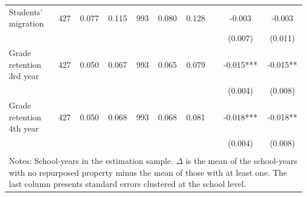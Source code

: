 \documentclass[12pt]{article}
\theoremstyle{plain}
\theoremstyle{plain}
\theoremstyle{plain}
\theoremstyle{definition}
\theoremstyle{plain}
\theoremstyle{definition}
\theoremstyle{plain}
\theoremstyle{remark}
\theoremstyle{definition}
\theoremstyle{definition}
\theoremstyle{plain}
\begin{document}
\begin{table}[H]
{\begin{tabular}{p{10.11em}lllllllll}
    \multicolumn{1}{l}{Students' migration} & \multicolumn{1}{c}{427} & \multicolumn{1}{c}{0.077} & \multicolumn{1}{c}{0.115} & \multicolumn{1}{c}{993} & \multicolumn{1}{c}{0.080} & \multicolumn{1}{c}{0.128} & \multicolumn{1}{c|}{} & \multicolumn{1}{c}{-0.003} & \multicolumn{1}{c}{-0.003} \\
    \multicolumn{1}{r}{} &       &       &       &       &       &       & \multicolumn{1}{c|}{} & \multicolumn{1}{c}{(0.007)} & \multicolumn{1}{c}{(0.011)} \\
    \multicolumn{1}{l}{Grade retention 3rd year} & \multicolumn{1}{c}{427} & \multicolumn{1}{c}{0.050} & \multicolumn{1}{c}{0.067} & \multicolumn{1}{c}{993} & \multicolumn{1}{c}{0.065} & \multicolumn{1}{c}{0.079} & \multicolumn{1}{c|}{} & \multicolumn{1}{c}{-0.015***} & \multicolumn{1}{c}{-0.015**} \\
    \multicolumn{1}{r}{} &       &       &       &       &       &       & \multicolumn{1}{c|}{} & \multicolumn{1}{c}{(0.004)} & \multicolumn{1}{c}{(0.008)} \\
    \multicolumn{1}{l}{Grade retention 4th year} & \multicolumn{1}{c}{427} & \multicolumn{1}{c}{0.050} & \multicolumn{1}{c}{0.068} & \multicolumn{1}{c}{993} & \multicolumn{1}{c}{0.068} & \multicolumn{1}{c}{0.081} & \multicolumn{1}{c|}{} & \multicolumn{1}{c}{-0.018***} & \multicolumn{1}{c}{-0.018**} \\
    \multicolumn{1}{r}{} &       &       &       &       &       &       & \multicolumn{1}{c|}{} & \multicolumn{1}{c}{(0.004)} & \multicolumn{1}{c}{(0.008)} \\
    \multicolumn{1}{r}{} &       &       &       &       &       &       &       &       &  \\
    \midrule
    \multicolumn{10}{p{53.61em}}{Notes: School-years in the estimation sample. $\Delta$ is the mean of the school-years with no repurposed property minus the mean of those with at least one. The last column presents standard errors clustered at the school level.} \\
    \end{tabular}%
}
\end{table}


\end{document}
